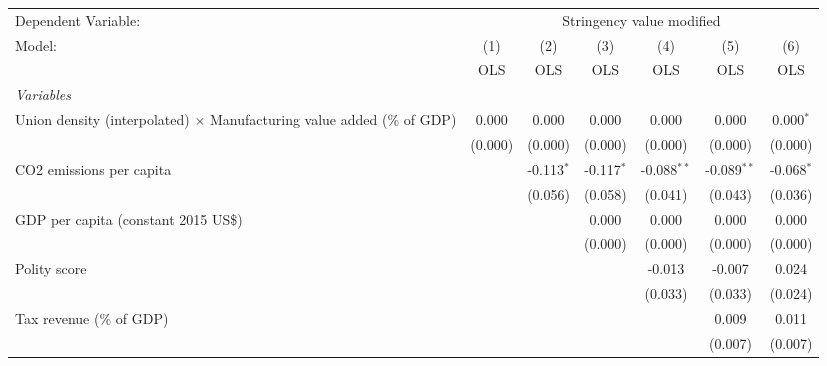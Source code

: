 
\begingroup
\centering
\begin{tabular}{lcccccc}
   \toprule
   Dependent Variable: & \multicolumn{6}{c}{Stringency value modified}\\
   Model:                                                                        & (1)     & (2)          & (3)          & (4)           & (5)           & (6)\\  
                                                                                 &  OLS    & OLS          & OLS          & OLS           & OLS           & OLS\\  
   \midrule
   \emph{Variables}\\
   Union density (interpolated) $\times$ Manufacturing value added (\% of GDP)   & 0.000   & 0.000        & 0.000        & 0.000         & 0.000         & 0.000$^{*}$\\   
                                                                                 & (0.000) & (0.000)      & (0.000)      & (0.000)       & (0.000)       & (0.000)\\   
   CO2 emissions per capita                                                      &         & -0.113$^{*}$ & -0.117$^{*}$ & -0.088$^{**}$ & -0.089$^{**}$ & -0.068$^{*}$\\   
                                                                                 &         & (0.056)      & (0.058)      & (0.041)       & (0.043)       & (0.036)\\   
   GDP per capita (constant 2015 US\$)                                           &         &              & 0.000        & 0.000         & 0.000         & 0.000\\   
                                                                                 &         &              & (0.000)      & (0.000)       & (0.000)       & (0.000)\\   
   Polity score                                                                  &         &              &              & -0.013        & -0.007        & 0.024\\   
                                                                                 &         &              &              & (0.033)       & (0.033)       & (0.024)\\   
   Tax revenue (\% of GDP)                                                       &         &              &              &               & 0.009         & 0.011\\   
                                                                                 &         &              &              &               & (0.007)       & (0.007)\\   

\end{tabular}
